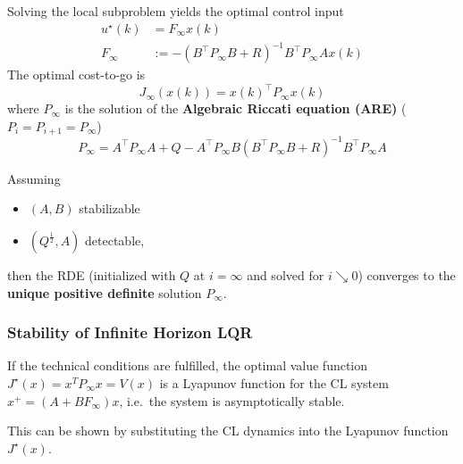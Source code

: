 Solving the local subproblem yields the optimal control input
\begin{align*}
    u^\star(k) & = F_\infty x(k)                                       \\
    F_\infty   & := -{(B^\top P_\infty B+R)}^{-1}B^\top P_\infty Ax(k)
\end{align*}
The optimal cost-to-go is
\begin{equation*}
    J_\infty(x(k))={x(k)}^\top P_\infty x(k)
\end{equation*}
where $P_\infty$ is the solution of the \textbf{Algebraic Riccati equation (ARE)} ($P_i = P_{i+1} = P_{\infty}$)
\begin{equation*}
    P_\infty=A^\top P_\infty A+Q-A^\top P_\infty B{(B^\top P_\infty B+R)}^{-1}B^\top P_\infty A
\end{equation*}


\newpar{}

Assuming
\begin{itemize}
    \item $(A,B)$ stabilizable
    \item $(Q^{\frac{1}{2}}, A)$ detectable,
\end{itemize}
then the RDE (initialized with $Q$ at $i = \infty$ and solved for $i\searrow 0$) converges to the \textbf{unique positive definite} solution $P_{\infty}$.

\subsubsection{Stability of Infinite Horizon LQR}

If the technical conditions are fulfilled, the optimal value function $J^{\star} (x) = x^T P_{\infty} x = V(x)$ is a Lyapunov function for the CL system $x^+ = (A + BF_{\infty} )x$, i.e.\ the system is asymptotically stable.

This can be shown by substituting the CL dynamics into the Lyapunov function $J^{\star} (x)$.




